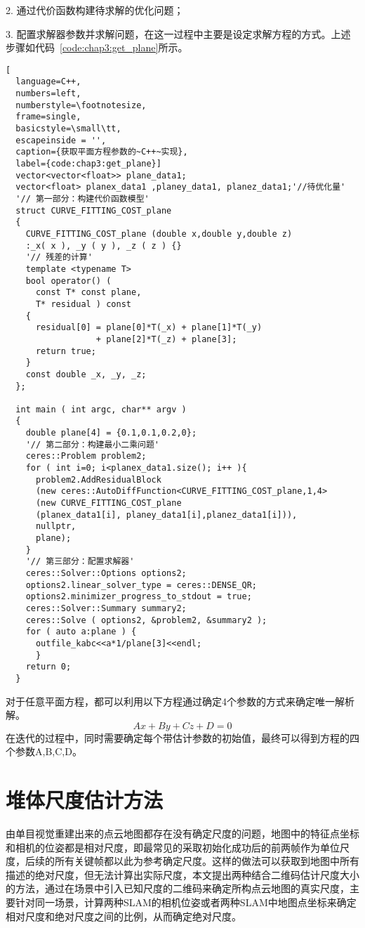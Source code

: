 2. 通过代价函数构建待求解的优化问题；

3. 配置求解器参数并求解问题，在这一过程中主要是设定求解方程的方式。上述步骤如代码~\ref{code:chap3:get_plane}所示。
\begin{lstlisting}[
  language=C++,
  numbers=left,                
  numberstyle=\footnotesize,
  frame=single,     
  basicstyle=\small\tt,    
  escapeinside = '',
  caption={获取平面方程参数的~C++~实现},
  label={code:chap3:get_plane}]
  vector<vector<float>> plane_data1;
  vector<float> planex_data1 ,planey_data1, planez_data1;'//待优化量'
  '// 第一部分：构建代价函数模型'
  struct CURVE_FITTING_COST_plane
  {
    CURVE_FITTING_COST_plane (double x,double y,double z)
    :_x( x ), _y ( y ), _z ( z ) {}
    '// 残差的计算'
    template <typename T>
    bool operator() (
      const T* const plane,    
      T* residual ) const 
    {
      residual[0] = plane[0]*T(_x) + plane[1]*T(_y) 
                  + plane[2]*T(_z) + plane[3]; 
      return true;
    }
    const double _x, _y, _z;
  };

  int main ( int argc, char** argv )
  {   
    double plane[4] = {0.1,0.1,0.2,0};
    '// 第二部分：构建最小二乘问题'
    ceres::Problem problem2;
    for ( int i=0; i<planex_data1.size(); i++ ){
      problem2.AddResidualBlock 
      (new ceres::AutoDiffFunction<CURVE_FITTING_COST_plane,1,4> 
      (new CURVE_FITTING_COST_plane 
      (planex_data1[i], planey_data1[i],planez_data1[i])),
      nullptr,
      plane);
    }
    '// 第三部分：配置求解器'
    ceres::Solver::Options options2;    
    options2.linear_solver_type = ceres::DENSE_QR;
    options2.minimizer_progress_to_stdout = true; 
    ceres::Solver::Summary summary2;                 
    ceres::Solve ( options2, &problem2, &summary2 );
    for ( auto a:plane ) {
      outfile_kabc<<a*1/plane[3]<<endl;
      }
    return 0;
  }
\end{lstlisting}
对于任意平面方程，都可以利用以下方程通过确定4个参数的方式来确定唯一解析解。
\begin{equation}Ax+By+Cz+D= 0\label{equ:plane}\end{equation}
在迭代的过程中，同时需要确定每个带估计参数的初始值，最终可以得到方程的四个参数A,B,C,D。

\section{堆体尺度估计方法}
\label{sec:4.3}
由单目视觉重建出来的点云地图都存在没有确定尺度的问题，地图中的特征点坐标和相机的位姿都是相对尺度，即最常见的采取初始化成功后的前两帧作为单位尺度，后续的所有关键帧都以此为参考确定尺度。这样的做法可以获取到地图中所有描述的绝对尺度，但无法计算出实际尺度，本文提出两种结合二维码估计尺度大小的方法，通过在场景中引入已知尺度的二维码来确定所构点云地图的真实尺度，主要针对同一场景，计算两种SLAM的相机位姿或者两种SLAM中地图点坐标来确定相对尺度和绝对尺度之间的比例，从而确定绝对尺度。
